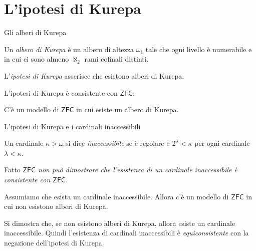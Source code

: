 \documentclass{beamer}
\theoremstyle{num.custom-title}
\theoremstyle{custom-title}
\newcommand{\ZFC}{\ensuremath{\mathsf{ZFC}}\xspace}
\begin{document}
\section{L'ipotesi di Kurepa}


\begin{frame}{Gli alberi di Kurepa}

\begin{definition}
Un \emph{albero di Kurepa} è un albero di altezza $\omega_1$ tale che ogni livello è numerabile e in cui ci sono almeno $\aleph_2$ rami cofinali distinti.
\end{definition}

L'\emph{ipotesi di Kurepa} asserisce che esistono alberi di Kurepa.

\pause

L'ipotesi di Kurepa è consistente con \ZFC:

\begin{theorem}[Stewart, 1966]
C'è un modello di \ZFC in cui esiste un albero di Kurepa.
\end{theorem}

\end{frame}


\begin{frame}{L'ipotesi di Kurepa e i cardinali inaccessibili}

\vspace{5pt}

\begin{definition}
Un cardinale $\kappa > \omega$ si dice \emph{inaccessibile} se è regolare e $2^\lambda < \kappa$ per ogni cardinale $\lambda < \kappa$.
\end{definition}

\begin{block}{Fatto}
\textit{\ZFC non può dimostrare che l'esistenza di un cardinale inaccessibile è consistente con \ZFC.}
\end{block}

\pause

\begin{theorem}[Silver, 1971]
Assumiamo che esista un cardinale inaccessibile. Allora c'è un modello di \ZFC in cui non esistono alberi di Kurepa.
\end{theorem}

Si dimostra che, se non esistono alberi di Kurepa, allora esiste un cardinale inaccessibile. Quindi l'esistenza di cardinali inaccessibili è \emph{equiconsistente} con la negazione dell'ipotesi di Kurepa.

\end{frame}
\end{document}
